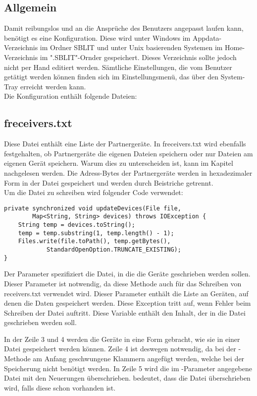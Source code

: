 \subsection{Allgemein}
Damit \sblit reibungslos und an die Ansprüche des Benutzers angepasst laufen kann, benötigt es eine Konfiguration. Diese wird unter Windows im Appdata-Verzeichnis im Ordner SBLIT und unter Unix basierenden Systemen im Home-Verzeichnis im ".SBLIT"-Ornder gespeichert. Dieses Verzeichnis sollte jedoch nicht per Hand editiert werden. Sämtliche Einstellungen, die vom Benutzer getätigt werden können finden sich im Einstellungsmenü, das über den System-Tray erreicht werden kann.\\
Die Konfiguration enthält folgende Dateien:
\subsection{freceivers.txt}
Diese Datei enthält eine Liste der Partnergeräte. In freceivers.txt wird ebenfalls festgehalten, ob Partnergeräte die eigenen Dateien speichern oder nur Dateien am eigenen Gerät speichern. Warum dies zu unterscheiden ist, kann im Kapitel  nachgelesen werden. Die Adress-Bytes der Partnergeräte werden in hexadezimaler Form in der Datei gespeichert und werden durch Beistriche getrennt. \\
Um die Datei zu schreiben wird folgender Code verwendet: \\
\javalisting
\begin{minipage}{\linewidth}
\begin{lstlisting}[caption={Schreiben der Gerätedatei},captionpos=b]
private synchronized void updateDevices(File file,
		Map<String, String> devices) throws IOException {
	String temp = devices.toString();
	temp = temp.substring(1, temp.length() - 1);
	Files.write(file.toPath(), temp.getBytes(),
			StandardOpenOption.TRUNCATE_EXISTING);
}
\end{lstlisting}
\end{minipage}
\begin{description}
	Der Parameter spezifiziert die Datei, in die die Geräte geschrieben werden sollen. Dieser Parameter ist notwendig, da diese Methode auch für das Schreiben von receivers.txt  verwendet wird.
	Dieser Parameter enthält die Liste an Geräten, auf denen die Daten gespeichert werden.
	Diese Exception tritt auf, wenn Fehler beim Schreiben der Datei auftritt.
	Diese Variable enthält den Inhalt, der in die Datei geschrieben werden soll. 
\end{description}
In der Zeile 3 und 4 werden die Geräte in eine Form gebracht, wie sie in einer Datei gespeichert werden können. Zeile 4 ist deswegen notwendig, da bei der -Methode am Anfang geschwungene Klammern angefügt werden, welche bei der Speicherung nicht benötigt werden. In Zeile 5 wird die im -Parameter angegebene Datei mit den Neuerungen überschrieben.  bedeutet, dass die Datei überschrieben wird, falls diese schon vorhanden ist.

